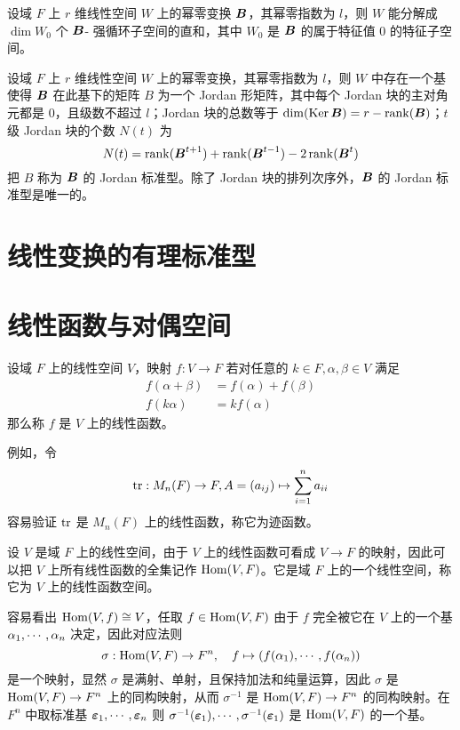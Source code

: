 \begin{theorem}
	设域 $F$ 上 $r$ 维线性空间 $W$ 上的幂零变换 $\boldsymbol{B}$，其幂零指数为 $l$，则 $W$ 能分解成 $\dim W_0$ 个 $\boldsymbol{B}$- 强循环子空间的直和，其中 $W_0$ 是 $\boldsymbol{B}$ 的属于特征值 $0$ 的特征子空间。
\end{theorem}

\begin{theorem}
	设域 $F$ 上 $r$ 维线性空间 $W$ 上的幂零变换，其幂零指数为 $l$，则 $W$ 中存在一个基使得 $\boldsymbol{B}$ 在此基下的矩阵 $B$ 为一个 Jordan 形矩阵，其中每个 Jordan 块的主对角元都是 $0$，且级数不超过 $l$；Jordan 块的总数等于 $\dim(\operatorname{Ker} \boldsymbol{B}) = r - \operatorname{rank}(\boldsymbol{B})$；$t$ 级 Jordan 块的个数 $N(t)$ 为
	\[ N(t) = \operatorname{rank}(\boldsymbol{B}^{t+1}) + \operatorname{rank}(\boldsymbol{B}^{t-1}) - 2 \operatorname{rank}(\boldsymbol{B}^t) \]
	把 $B$ 称为 $\boldsymbol{B}$ 的 Jordan 标准型。除了 Jordan 块的排列次序外，$\boldsymbol{B}$ 的 Jordan 标准型是唯一的。
\end{theorem}

\section{线性变换的有理标准型}

\section{线性函数与对偶空间}

\begin{definition}[线性函数]
	设域 $F$ 上的线性空间 $V$，映射 $f : V \to F$ 若对任意的 $k \in F, \alpha,\beta \in V$ 满足
	\begin{equation*}
		\begin{aligned}
			f(\alpha+\beta) & = f(\alpha) + f(\beta) \\
			f(k\alpha)	  & = kf(\alpha)
		\end{aligned}
	\end{equation*}
	那么称 $f$ 是 $V$ 上的线性函数。
\end{definition}

例如，令
\[ \operatorname{tr} : M_n(F) \to F, A = (a_{ij}) \mapsto \sum_{i=1}^{n} a_{ii} \]
容易验证 $\operatorname{tr}$ 是 $M_n(F)$ 上的线性函数，称它为迹函数。

设 $V$ 是域 $F$ 上的线性空间，由于 $V$ 上的线性函数可看成 $V \to F$ 的映射，因此可以把 $V$ 上所有线性函数的全集记作 $\operatorname{Hom}(V,F)$。它是域 $F$ 上的一个线性空间，称它为 $V$ 上的线性函数空间。

容易看出 $\operatorname{Hom}(V,f) \cong V$，任取 $f \in \operatorname{Hom}(V,F)$ 由于 $f$ 完全被它在 $V$ 上的一个基 $\alpha_1,\cdots,\alpha_n$ 决定，因此对应法则
\[ \sigma : \operatorname{Hom}(V,F) \to F^n, \quad f \mapsto (f(\alpha_1),\cdots,f(\alpha_n)) \]
是一个映射，显然 $\sigma$ 是满射、单射，且保持加法和纯量运算，因此 $\sigma$ 是 $\operatorname{Hom}(V,F) \to F^n$ 上的同构映射，从而 $\sigma^{-1}$ 是 $\operatorname{Hom}(V,F) \to F^n$ 的同构映射。在 $F^n$ 中取标准基 $\boldsymbol{\varepsilon}_1,\cdots,\boldsymbol{\varepsilon}_n$ 则 $\sigma^{-1}(\boldsymbol{\varepsilon}_1),\cdots,\sigma^{-1}(\boldsymbol{\varepsilon}_1)$ 是 $\operatorname{Hom}(V,F)$ 的一个基。

